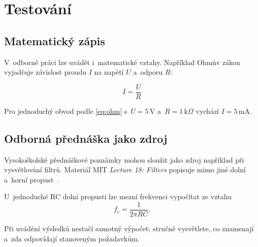 
\chapter{Testování}
\label{chap:testovani}

\section{Matematický zápis}

V~odborné práci lze uvádět i~matematické vztahy. Například Ohmův zákon
vyjadřuje závislost proudu $I$ na napětí $U$ a~odporu $R$:

\begin{equation}
  I = \frac{U}{R}
  \label{eq:ohm}
\end{equation}

Pro jednoduchý obvod podle \autoref{eq:ohm} s~$U=5\,\mathrm{V}$
a~$R=1\,\mathrm{k}\Omega$ vychází $I=5\,\mathrm{mA}$.

\section{Odborná přednáška jako zdroj}

Vysokoškolské přednáškové poznámky mohou sloužit jako zdroj například
při vysvětlování filtrů. Materiál MIT \emph{Lecture 18: Filters}
popisuje mimo jiné dolní a~horní propust~\cite{mitfilters}.

U~jednoduché RC dolní propusti lze mezní frekvenci vypočítat ze vztahu
\begin{equation}
  f_{\mathrm c} = \frac{1}{2\pi RC}.
  \label{eq:rc}
\end{equation}

Při uvádění výsledků nestačí samotný výpočet; stručně vysvětlete,
co znamenají a~zda odpovídají stanoveným požadavkům.
